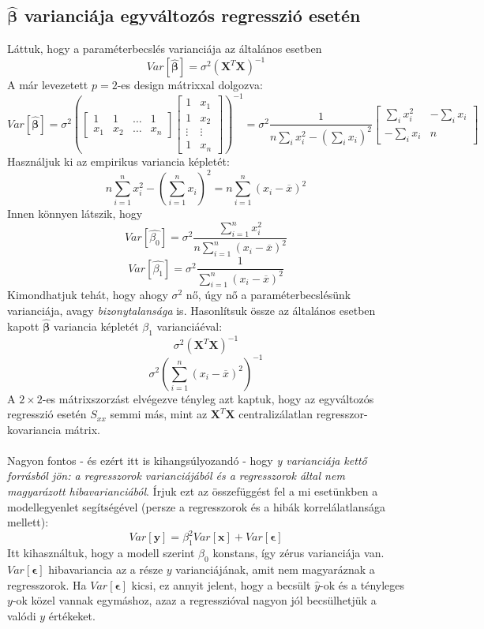 \documentclass[14p]{report}
\def\pmb{\boldsymbol}
\def\ebeta{\hat{\pmb{\beta}}}
\def\e{\epsilon}
\def\bar{\overline}
\begin{document}
	\subsection{$\ebeta$ varianciája egyváltozós regresszió esetén}
	Láttuk, hogy a paraméterbecslés varianciája az általános esetben
	\[
	Var[\ebeta] = \sigma^2(\pmb{X}^T\pmb{X})^{-1}
	\]
	A már levezetett $p=2$-es design mátrixxal dolgozva:
	\[
	Var[\ebeta] = \sigma^2
	\left(\begin{bmatrix}
		1 & 1 & \dots & 1 \\
		x_1 & x_2 & \dots & x_n
	\end{bmatrix}
	\begin{bmatrix}
		1 & x_1 \\
		1 & x_2 \\
		\vdots & \vdots \\
		1 & x_n
	\end{bmatrix}\right)^{-1}
	=
	\sigma^2
	\frac{1}{n\sum_i{x_i^2} - (\sum_i{x_i})^2}
	\begin{bmatrix}
		\sum_i{x_i^2} & -\sum_i{x_i} \\
		-\sum_i{x_i} & n 
	\end{bmatrix}
	\]
	Használjuk ki az empirikus variancia képletét:
	\[
	n\sum_{i=1}^{n}{x_i^2} - (\sum_{i=1}^{n}{x_i})^2 = n\sum_{i=1}^{n}{(x_i - \bar{x})^2}
	\]
	Innen könnyen látszik, hogy
	\[
	Var[\hat{\beta_0}] = \sigma^2\frac{\sum_{i=1}^{n}{x_i^2}}{n\sum_{i=1}^{n}{(x_i - \bar{x})^2}}
	\]
	\[
	Var[\hat{\beta_1}] = \sigma^2\frac{1}{\sum_{i=1}^{n}{(x_i - \bar{x})^2}}
	\]
	Kimondhatjuk tehát, hogy ahogy $\sigma^2$ nő, úgy nő a paraméterbecslésünk varianciája, avagy \emph{bizonytalansága} is. Hasonlítsuk össze az általános esetben kapott $\ebeta$ variancia képletét $\beta_1$ varianciáéval:
	\[
	\sigma^2(\pmb{X}^T\pmb{X})^{-1}
	\]
	\[
	\sigma^2(\sum_{i=1}^{n}{(x_i - \bar{x})^2})^{-1}
	\]
	A $2 \times 2$-es mátrixszorzást elvégezve tényleg azt kaptuk, hogy az egyváltozós regresszió esetén $S_{xx}$ semmi más, mint az $\pmb{X}^T\pmb{X}$ centralizálatlan regresszor-kovariancia mátrix.
	\\
	\\
	Nagyon fontos - és ezért itt is kihangsúlyozandó - hogy \emph{y varianciája kettő forrásból jön: a regresszorok varianciájából és a regresszorok által nem magyarázott hibavarianciából}. Írjuk ezt az összefüggést fel a mi esetünkben a modellegyenlet segítségével (persze a regresszorok és a hibák korrelálatlansága mellett):
	\[
	Var[\pmb{y}] = \beta_1^2Var[\pmb{x}] + Var[\pmb{\e}] 
	\]
	Itt kihasználtuk, hogy a modell szerint $\beta_0$ konstans, így zérus varianciája van. $Var[\pmb{\e}]$ hibavariancia az a része $y$ varianciájának, amit nem magyaráznak a regresszorok. Ha $Var[\pmb{\e}]$ kicsi, ez annyit jelent, hogy a becsült $\hat{y}$-ok és a tényleges $y$-ok közel vannak egymáshoz, azaz a regresszióval nagyon jól becsülhetjük a valódi $y$ értékeket.
	
\end{document}
